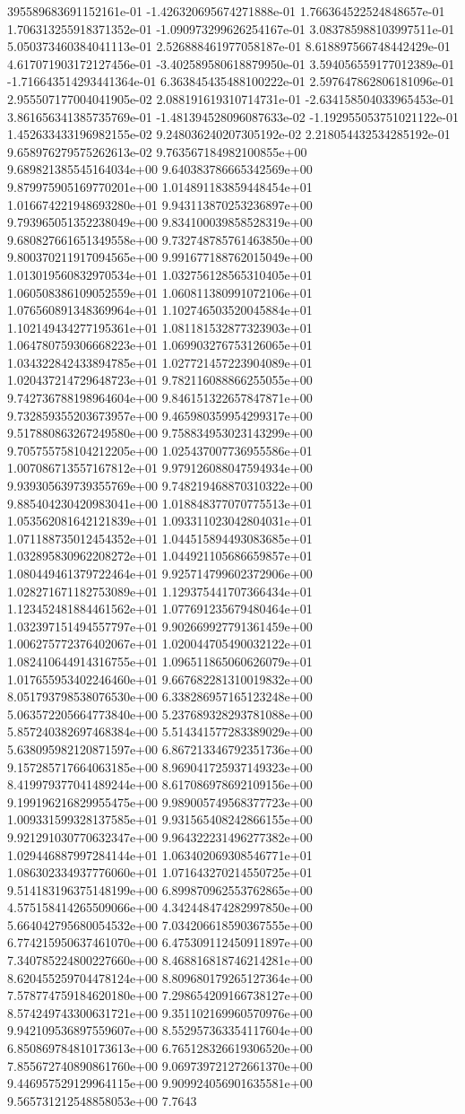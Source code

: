 395589683691152161e-01	-1.426320695674271888e-01	1.766364522524848657e-01	1.706313255918371352e-01	-1.090973299626254167e-01	3.083785988103997511e-01	5.050373460384041113e-01	2.526888461977058187e-01	8.618897566748442429e-01	4.617071903172127456e-01	-3.402589580618879950e-01	3.594056559177012389e-01	-1.716643514293441364e-01	6.363845435488100222e-01	2.597647862806181096e-01	2.955507177004041905e-02	2.088191619310714731e-01	-2.634158504033965453e-01	3.861656341385735769e-01	-1.481394528096087633e-02	-1.192955053751021122e-01	1.452633433196982155e-02	9.248036240207305192e-02	2.218054432534285192e-01	9.658976279575262613e-02
9.763567184982100855e+00	9.689821385545164034e+00	9.640383786665342569e+00	9.879975905169770201e+00	1.014891183859448454e+01	1.016674221948693280e+01	9.943113870253236897e+00	9.793965051352238049e+00	9.834100039858528319e+00	9.680827661651349558e+00	9.732748785761463850e+00	9.800370211917094565e+00	9.991677188762015049e+00	1.013019560832970534e+01	1.032756128565310405e+01	1.060508386109052559e+01	1.060811380991072106e+01	1.076560891348369964e+01	1.102746503520045884e+01	1.102149434277195361e+01	1.081181532877323903e+01	1.064780759306668223e+01	1.069903276753126065e+01	1.034322842433894785e+01	1.027721457223904089e+01	1.020437214729648723e+01	9.782116088866255055e+00	9.742736788198964604e+00	9.846151322657847871e+00	9.732859355203673957e+00	9.465980359954299317e+00	9.517880863267249580e+00	9.758834953023143299e+00	9.705755758104212205e+00	1.025437007736955586e+01	1.007086713557167812e+01	9.979126088047594934e+00	9.939305639739355769e+00	9.748219468870310322e+00	9.885404230420983041e+00	1.018848377070775513e+01	1.053562081642121839e+01	1.093311023042804031e+01	1.071188735012454352e+01	1.044515894493083685e+01	1.032895830962208272e+01	1.044921105686659857e+01	1.080449461379722464e+01	9.925714799602372906e+00	1.028271671182753089e+01	1.129375441707366434e+01	1.123452481884461562e+01	1.077691235679480464e+01	1.032397151494557797e+01	9.902669927791361459e+00	1.006275772376402067e+01	1.020044705490032122e+01	1.082410644914316755e+01	1.096511865060626079e+01	1.017655953402246460e+01	9.667682281310019832e+00	8.051793798538076530e+00	6.338286957165123248e+00	5.063572205664773840e+00	5.237689328293781088e+00	5.857240382697468384e+00	5.514341577283389029e+00	5.638095982120871597e+00	6.867213346792351736e+00	9.157285717664063185e+00	8.969041725937149323e+00	8.419979377041489244e+00	8.617086978692109156e+00	9.199196216829955475e+00	9.989005749568377723e+00	1.009331599328137585e+01	9.931565408242866155e+00	9.921291030770632347e+00	9.964322231496277382e+00	1.029446887997284144e+01	1.063402069308546771e+01	1.086302334937776060e+01	1.071643270214550725e+01	9.514183196375148199e+00	6.899870962553762865e+00	4.575158414265509066e+00	4.342448474282997850e+00	5.664042795680054532e+00	7.034206618590367555e+00	6.774215950637461070e+00	6.475309112450911897e+00	7.340785224800227660e+00	8.468816818746214281e+00	8.620455259704478124e+00	8.809680179265127364e+00	7.578774759184620180e+00	7.298654209166738127e+00	8.574249743300631721e+00	9.351102169960570976e+00	9.942109536897559607e+00	8.552957363354117604e+00	6.850869784810173613e+00	6.765128326619306520e+00	7.855672740890861760e+00	9.069739721272661370e+00	9.446957529129964115e+00	9.909924056901635581e+00	9.565731212548858053e+00	7.7643